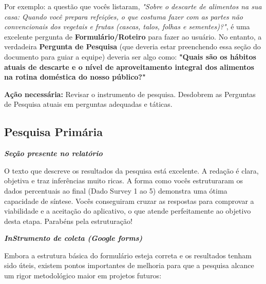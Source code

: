 \documentclass[
  sigconf,
  nonacm, %
  language=portuguese
]{acmart}
\newcommand{\statuswarn}[1]{{\small\bfseries\color{cwarn}#1}}
\begin{document}
Por exemplo: a questão que vocês listaram, \textit{"Sobre o descarte de alimentos na sua casa: Quando você prepara refeições, o que costuma fazer com as partes não convencionais dos vegetais e frutas (cascas, talos, folhas e sementes)?"}, é uma excelente pergunta de \textbf{Formulário/Roteiro} para fazer ao usuário. No entanto, a verdadeira \textbf{Pergunta de Pesquisa} (que deveria estar preenchendo essa seção do documento para guiar a equipe) deveria ser algo como: \textbf{"Quais são os hábitos atuais de descarte e o nível de aproveitamento integral dos alimentos na rotina doméstica do nosso público?"}

\textbf{Ação necessária:} Revisar o instrumento de pesquisa. Desdobrem as Perguntas de Pesquisa atuais em perguntas adequadas e táticas.

\subsection{Pesquisa Primária}

\noindent\statuswarn{0,85\,/\,1,00 pts · Completo c/ ressalvas}

\textit{\textbf{Seção presente no relatório}}

O texto que descreve os resultados da pesquisa está excelente. A redação é clara, objetiva e traz inferências muito ricas. A forma como vocês estruturaram os dados percentuais ao final (Dado Survey 1 ao 5) demonstra uma ótima capacidade de síntese. Vocês conseguiram cruzar as respostas para comprovar a viabilidade e a aceitação do aplicativo, o que atende perfeitamente ao objetivo desta etapa. Parabéns pela estruturação!

\textit{\textbf{InStrumento de coleta (Google forms)}}

Embora a estrutura básica do formulário esteja correta e os resultados tenham sido úteis, existem pontos importantes de melhoria para que a pesquisa alcance um rigor metodológico maior em projetos futuros:
\end{document}
